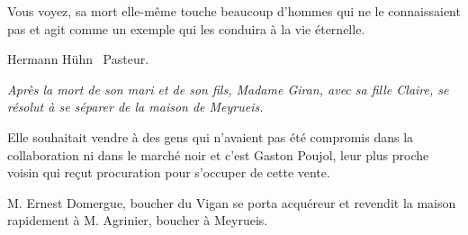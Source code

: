 Vous voyez, sa mort elle-même touche beaucoup d’hommes qui ne le connaissaient pas et agit
comme un exemple qui les conduira à la vie éternelle.

\begin{flushright}
Hermann Hühn \ Pasteur.
\end{flushright}

\vspace{1.5em}

\begin{tcolorbox}[colback=white,colframe=black]
\itshape
Après la mort de son mari et de son fils, Madame Giran, avec sa fille Claire, se résolut à
se séparer de la maison de Meyrueis.

Elle souhaitait vendre à des gens qui n’avaient pas été compromis dans la collaboration
ni dans le marché noir et c’est Gaston Poujol, leur plus proche voisin qui
reçut procuration pour s’occuper de cette vente.

M. Ernest Domergue, boucher du Vigan se porta acquéreur et revendit la maison
rapidement à M. Agrinier, boucher à Meyrueis.
\end{tcolorbox}
